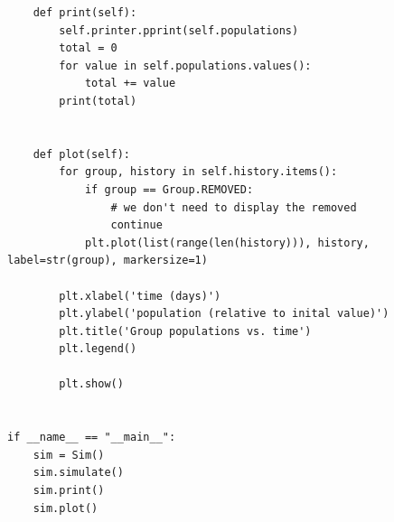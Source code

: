 \documentclass{article}
\begin{document}
\begin{lstlisting}
    def print(self):
        self.printer.pprint(self.populations)
        total = 0
        for value in self.populations.values():
            total += value
        print(total)


    def plot(self):
        for group, history in self.history.items():
            if group == Group.REMOVED:
                # we don't need to display the removed
                continue
            plt.plot(list(range(len(history))), history, label=str(group), markersize=1)

        plt.xlabel('time (days)')
        plt.ylabel('population (relative to inital value)')
        plt.title('Group populations vs. time')
        plt.legend()

        plt.show()


if __name__ == "__main__":
    sim = Sim()
    sim.simulate()
    sim.print()
    sim.plot()
\end{lstlisting}
\end{document}
